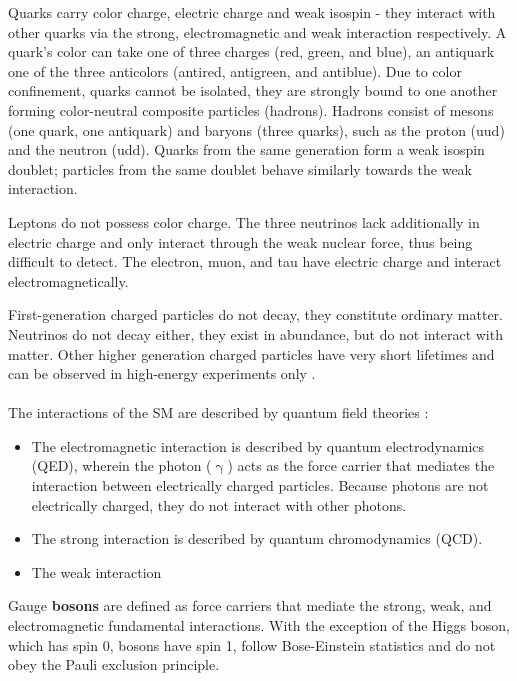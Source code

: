 Quarks carry color charge, electric charge and weak isospin - they interact with other quarks via the strong, electromagnetic and weak interaction respectively. A quark's color can take one of three charges (red, green, and blue), an antiquark one of the three anticolors (antired, antigreen, and antiblue). Due to color confinement, quarks cannot be isolated, they are strongly bound to one another forming color-neutral composite particles (hadrons). Hadrons consist of mesons (one quark, one antiquark) and baryons (three quarks), such as the proton (uud) and the neutron (udd). Quarks from the same generation form a weak isospin doublet; particles from the same doublet behave similarly towards the weak interaction.

Leptons do not possess color charge. The three neutrinos lack additionally in electric charge and only interact through the weak nuclear force, thus being difficult to detect. The electron, muon, and tau have electric charge and interact electromagnetically.

First-generation charged particles do not decay, they constitute ordinary matter. Neutrinos do not decay either, they exist in abundance, but do not interact with matter. Other higher generation charged particles have very short lifetimes and can be observed in high-energy experiments only \cite{wiki:standardmodel}.\\ \\
The interactions of the SM are described by quantum field theories \cite{welsch}:
\begin{itemize}
\item The electromagnetic interaction is described by quantum electrodynamics (QED), wherein the photon ($\upgamma$) acts as the force carrier that mediates the interaction between electrically charged particles. Because photons are not electrically charged, they do not interact with other photons.
\item The strong interaction is described by quantum chromodynamics (QCD). 
\item The weak interaction
\end{itemize}

Gauge \textbf{bosons} are defined as force carriers that mediate the strong, weak, and electromagnetic fundamental interactions. With the exception of the Higgs boson, which has spin 0, bosons have spin 1, follow Bose-Einstein statistics and do not obey the Pauli exclusion principle.\\

